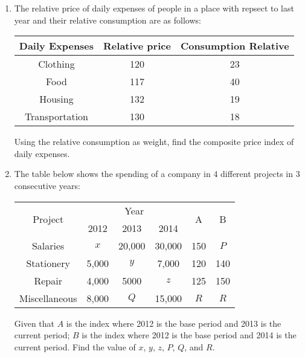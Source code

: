 \documentclass{report}
\begin{document}
\begin{multicols}{2}
\begin{enumerate}
    \item The relative price of daily expenses of people in a place with repsect to last
          year and their relative consumption are as follows:
          \begin{center}
            \begin{tabular}{|c|c|c|}
              \hline
              Daily Expenses & Relative price & Consumption Relative \\
              \hline
              Clothing       & 120            & 23                   \\
              Food           & 117            & 40                   \\
              Housing        & 132            & 19                   \\
              Transportation & 130            & 18                   \\
              \hline
            \end{tabular}
          \end{center}
          Using the relative consumption as weight, find the composite price index of daily expenses.

    \item The table below shows the spending of a company in 4 different projects in 3
          consecutive years:
          \begin{center}
            \begin{tabular}{|c|c|c|c|c|c|}
              \hline
              \multirow{2}{*}{Project} & \multicolumn{3}{c|}{Year} & \multirow{2}{*}{A} & \multirow{2}{*}{B}             \\
              \cline{2-4}
                                       & 2012                      & 2013               & 2014               &     &     \\
              \hline
              Salaries                 & $x$                       & 20,000             & 30,000             & 150 & $P$ \\
              Stationery               & 5,000                     & $y$                & 7,000              & 120 & 140 \\
              Repair                   & 4,000                     & 5000               & $z$                & 125 & 150 \\
              Miscellaneous            & 8,000                     & $Q$                & 15,000             & $R$ & $R$ \\
              \hline
            \end{tabular}
          \end{center}
          Given that $A$ is the index where 2012 is the base period and 2013 is the current period; $B$ is the index where 2012 is the base period and 2014 is the current period. Find the value of $x$, $y$, $z$, $P$, $Q$, and $R$.


\end{enumerate}
\end{multicols}
\end{document}
